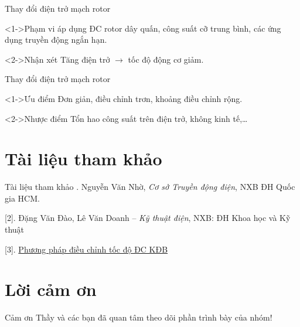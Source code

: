 \documentclass[20pt]{beamer}
\begin{document}
\begin{frame}{Thay đổi điện trở mạch rotor}
	\begin{block}<1->{Phạm vi áp dụng}
		\justifying
		ĐC rotor dây quấn, công suất cỡ trung bình, các ứng dụng truyền động ngắn hạn.
	\end{block}

	\begin{block}<2->{Nhận xét}
		\textcolor{doden}{Tăng điện trở} $\longrightarrow$ \textcolor{doden}{tốc độ động cơ giảm}.
	\end{block}
\end{frame}

\begin{frame}{Thay đổi điện trở mạch rotor}
	\begin{block}<1->{Ưu điểm}
		\justifying
		Đơn giản, điều chỉnh trơn, khoảng điều chỉnh rộng.
	\end{block}
	
	\begin{block}<2->{Nhược điểm}
		\justifying
		Tổn hao công suất trên điện trở, không kinh tế,\ldots
	\end{block}
\end{frame}

\section*{Tài liệu tham khảo}
\begin{frame}{Tài liệu tham khảo}
\justifying
[1]. Nguyễn Văn Nhờ, \textit{Cơ sở Truyền động điện}, NXB ĐH Quốc gia HCM.

[2]. Đặng Văn Đào, Lê Văn Doanh -- \textit{Kỹ thuật điện}, NXB: ĐH Khoa học và Kỹ thuật

[3]. \href{http://maynenkhitrucvit.com.vn/index.php/ky-thuat/50-dong-co-may-nen-khi/81-phuong-phap-dieu-chinh-toc-do-dong-co-khong-dong-bo.html}{Phương  pháp điều chỉnh tốc độ ĐC KĐB}
\end{frame}
\section*{Lời cảm ơn}
\begin{frame}
\justifying
\large \alert{Cảm ơn Thầy và các bạn đã quan tâm theo dõi phần trình bày của nhóm!}
\end{frame}
\end{document}
